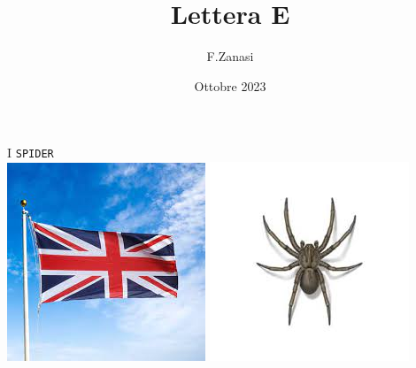\documentclass[]{article}
\title{Lettera E}
\author{F.Zanasi}
\date{Ottobre 2023}
\begin{document}
{\fontsize{150}{160}\selectfont I} 
\hspace{2.0in}
{\fontsize{80}{80}\color{black}\texttt{SP}\color{blue}\texttt{I}\color{black}\texttt{DER}} 
\\[1cm]
\includegraphics[scale=0.3]{flag-UK}
\includegraphics[scale=0.4]{spider}
\end{document}
